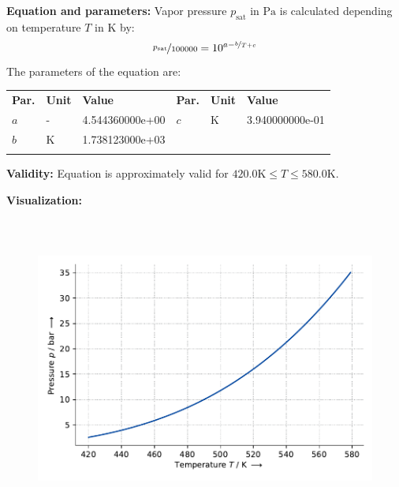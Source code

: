 \textbf{Equation and parameters:}
\newline
%
Vapor pressure $p_\mathrm{sat}$ in $\si{\pascal}$ is calculated depending on temperature $T$ in $\si{\kelvin}$ by:
%
\begin{equation*}
\nicefrac{p_\mathrm{sat}}{100000} = 10^{a - \nicefrac{b}{T + c}}
\end{equation*}
%
The parameters of the equation are:
%
\begin{longtable}[l]{lll|lll}
\toprule
\addlinespace
\textbf{Par.} & \textbf{Unit} & \textbf{Value} &	\textbf{Par.} & \textbf{Unit} & \textbf{Value} \\
\addlinespace
\midrule
\endhead

\bottomrule
\endfoot
\bottomrule
\endlastfoot
\addlinespace

$a$ & - & 4.544360000e+00 & $c$ & $\si{\kelvin}$  & 3.940000000e-01 \\
$b$ & $\si{\kelvin}$ & 1.738123000e+03 & & & \\

\addlinespace\end{longtable}

\textbf{Validity:}
\newline
Equation is approximately valid for $420.0 \si{\kelvin} \leq T \leq 580.0 \si{\kelvin}$.
\newline

\textbf{Visualization:}
%
\begin{figure}[!htp]
{\noindent\includegraphics[height=10cm, keepaspectratio]{figs/ref/ref_Toluene_VaporPressure_Antoine_3.pdf}}
\end{figure}
%

